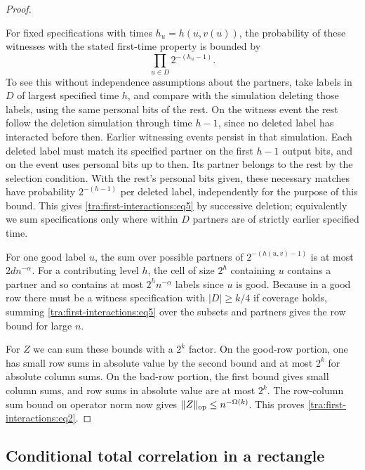 \begin{proof}
\begin{itemize}
  For fixed specifications with times \(h_u=h(u,v(u))\), the probability of these witnesses with the stated first-time property is bounded by
  \begin{equation}
                                   \prod_{u\in D} 2^{-(h_u-1)}.\label{tra:first-interactions:eq5}
  \end{equation}
  To see this without independence assumptions about the partners, take labels in \(D\) of largest specified time \(h\), and compare with the simulation deleting those labels, using the same personal bits of the rest. On the witness event the rest follow the deletion simulation through time \(h-1\), since no deleted label has interacted before then. Earlier witnessing events persist in that simulation. Each deleted label must match its specified partner on the first \(h-1\) output bits, and on the event uses personal bits up to then. Its partner belongs to the rest by the selection condition. With the rest's personal bits given, these necessary matches have probability \(2^{-(h-1)}\) per deleted label, independently for the purpose of this bound. This gives \eqref{tra:first-interactions:eq5} by successive deletion; equivalently we sum specifications only where within \(D\) partners are of strictly earlier specified time.

  For one good label \(u\), the sum over possible partners of \(2^{-(h(u,v)-1)}\) is at most \(2d n^{-\alpha}\). For a contributing level \(h\), the cell of size \(2^h\) containing \(u\) contains a partner and so contains at most \(2^h n^{-\alpha}\) labels since \(u\) is good. Because in a good row there must be a witness specification with \(|D|\ge k/4\) if coverage holds, summing \eqref{tra:first-interactions:eq5} over the subsets and partners gives the row bound for large \(n\).

\end{itemize}
For \(Z\) we can sum these bounds with a \(2^k\) factor. On the good-row portion, one has small row sums in absolute value by the second bound and at most \(2^k\) for absolute column sums. On the bad-row portion, the first bound gives small column sums, and row sums in absolute value are at most \(2^k\). The row-column sum bound on operator norm now gives \(\|Z\|_{\rm op}\le n^{-\Omega(k)}\). This proves \eqref{tra:first-interactions:eq2}.

\end{proof}

\subsection{Conditional total correlation in a rectangle}

